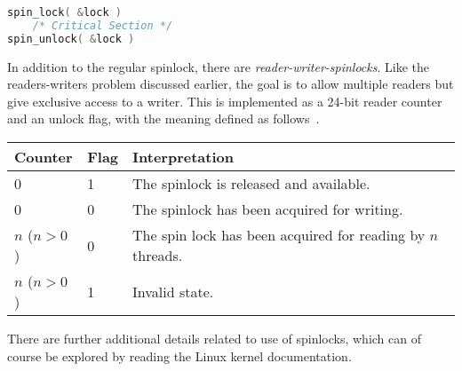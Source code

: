\begin{lstlisting}[language=C]
spin_lock( &lock )
    /* Critical Section */
spin_unlock( &lock )
\end{lstlisting}

In addition to the regular spinlock, there are \textit{reader-writer-spinlocks}. Like the readers-writers problem discussed earlier, the goal is to allow multiple readers but give exclusive access to a writer. This is implemented as a 24-bit reader counter and an unlock flag, with the meaning defined as follows~\cite{osi}.

\begin{center}
	\begin{tabular}{l|l|l}
		\textbf{Counter} & \textbf{Flag} & \textbf{Interpretation}                                     \\\hline
		0                & 1             & The spinlock is released and available.                     \\
		0                & 0             & The spinlock has been acquired for writing.                 \\
		$n$ ($n > 0$)    & 0             & The spin lock has been acquired for reading by $n$ threads. \\
		$n$ ($n > 0$)    & 1             & Invalid state.                                              \\
	\end{tabular}
\end{center}

There are further additional details related to use of spinlocks, which can of course be explored by reading the Linux kernel documentation.





